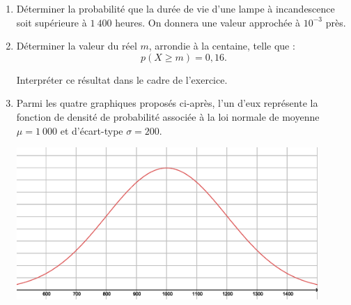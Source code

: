 \begin{enumerate}
     \item
     Déterminer la probabilité que la durée de vie d'une lampe à incandescence soit supérieure à $1\ 400$ heures. On donnera une valeur approchée à $10^{-3}$ près.
     \item
     Déterminer la valeur du réel $m$, arrondie à la centaine, telle que :
     \[ p(X \geqslant m) = 0,16. \]
     \par
     Interpréter ce résultat dans le cadre de l'exercice.
     \item
     Parmi les quatre graphiques proposés ci-après, l'un d'eux représente la fonction de densité de probabilité associée à la loi normale de moyenne $\mu =1\ 000$ et d'écart-type $\sigma = 200$.
     \par
     \begin{center}
          \begin{extern}%
               \includegraphics[width=0.9\textwidth]{images/BBESL-s5-1-1}%
          \end{extern}
     \end{center}


\end{enumerate}
